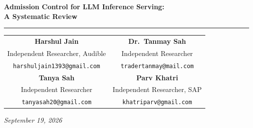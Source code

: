 \documentclass[11pt,letterpaper]{article}
\theoremstyle{definition}
\begin{document}
\begin{center}
{\LARGE\bfseries Admission Control for LLM Inference Serving:\\[0.2em] A Systematic Review\par}

\vspace{1em}
{\color{admitgrey}\rule{0.55\textwidth}{0.6pt}}
\vspace{1em}

{\normalsize
\renewcommand{\arraystretch}{1.15}
\begin{tabular}{cc}
\textbf{Harshul Jain} & \textbf{Dr.\ Tanmay Sah} \\
Independent Researcher, Audible & Independent Researcher \\
{\small\texttt{harshuljain1393@gmail.com}} & {\small\texttt{tradertanmay@mail.com}} \\[0.7em]
\textbf{Tanya Sah} & \textbf{Parv Khatri} \\
Independent Researcher & Independent Researcher, SAP \\
{\small\texttt{tanyasah20@gmail.com}} & {\small\texttt{khatriparv@gmail.com}} \\
\end{tabular}
}

\vspace{0.8em}
{\itshape September 19, 2026}
\end{center}

\vspace{1em}
\end{document}
